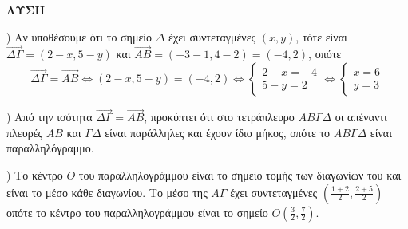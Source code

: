 \textbf{ΛΥΣΗ}

\noindent \textalpha) Αν υποθέσουμε ότι το σημείο $\Delta$ έχει συντεταγμένες $(x, y)$, τότε είναι $\vec{\Delta\Gamma}=(2-x, 5-y)$ και
$\vec{AB}=(-3-1, 4-2)=(-4, 2)$, οπότε
\[ \vec{\Delta\Gamma}=\vec{AB} \Leftrightarrow (2-x, 5-y)=(-4, 2) \Leftrightarrow \left\{ \begin{array}{l} 2-x=-4 \\ 5-y=2 \end{array} \right. \Leftrightarrow \left\{ \begin{array}{l} x=6 \\ y=3 \end{array} \right. \]

\noindent \textbeta) Από την ισότητα $\vec{\Delta\Gamma}=\vec{AB}$, προκύπτει ότι στο τετράπλευρο $AB\Gamma\Delta$ οι απέναντι πλευρές $AB$ και $\Gamma\Delta$ είναι παράλληλες και έχουν ίδιο μήκος, οπότε το $AB\Gamma\Delta$ είναι παραλληλόγραμμο.

\noindent \textgamma) Το κέντρο $O$ του παραλληλογράμμου είναι το σημείο τομής των διαγωνίων του και είναι το μέσο κάθε διαγωνίου. Το μέσο της $A\Gamma$ έχει συντεταγμένες $\left(\frac{1+2}{2}, \frac{2+5}{2}\right)$ οπότε το κέντρο του παραλληλογράμμου είναι το σημείο $O\left(\frac{3}{2}, \frac{7}{2}\right)$.